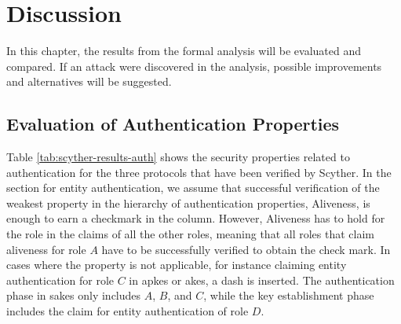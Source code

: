 \chapter{Discussion}
\label{chp:discussion}

In this chapter, the results from the formal analysis will be evaluated and compared. If an attack were discovered in the analysis, possible improvements and alternatives will be suggested.


\section{Evaluation of Authentication Properties}


Table \ref{tab:scyther-results-auth} shows the security properties related to authentication for the three protocols that have been verified by Scyther. In the section for entity authentication, we assume that successful verification of the weakest property in the hierarchy of authentication properties, Aliveness, is enough to earn a checkmark in the column. However, Aliveness has to hold for the role in the claims of all the other roles, meaning that all roles that claim aliveness for role $A$ have to be successfully verified to obtain the check mark. In cases where the property is not applicable, for instance claiming entity authentication for role $C$ in \gls{apkes} or \gls{akes}, a dash is inserted. The authentication phase in \gls{sakes} only includes $A$, $B$, and $C$, while the key establishment phase includes the claim for entity authentication of role $D$.

\begin{table}[h]
\centering
{}
\caption[Table of the security properties for authentication that are satisfied in the different protocols.]{Table of the security properties for authentication that are satisfied in the different protocols. \checkmark indicates that that the property is verified, $\times$ that the property is falsified, and $-$ that the property is inapplicable for the protocol.}
\label{tab:scyther-results-auth}
\end{table}

